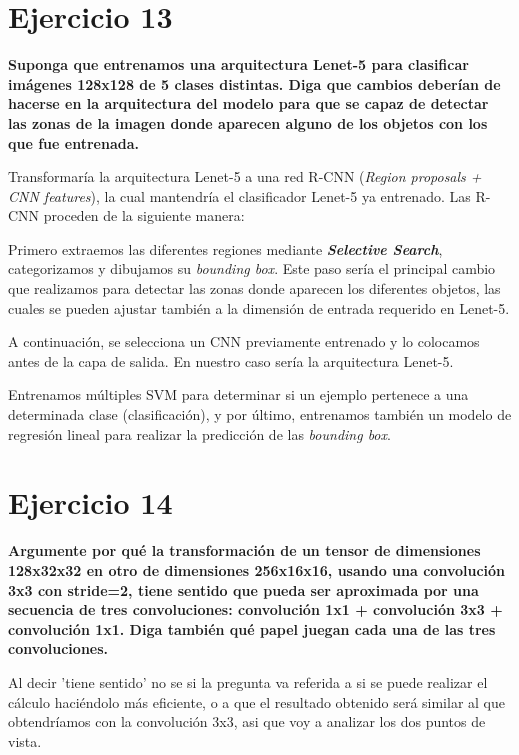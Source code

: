 \documentclass[11pt,a4paper]{article}
\begin{document}
\section*{Ejercicio 13}

\textbf{Suponga que entrenamos una arquitectura Lenet-5 para clasificar imágenes 128x128 de 5 clases distintas. Diga que cambios deberían de hacerse en la arquitectura
del modelo para que se capaz de detectar las zonas de la imagen donde aparecen alguno de los objetos con los que fue entrenada.}

Transformaría la arquitectura Lenet-5 a una red R-CNN (\textit{Region proposals + CNN features}), la cual mantendría el clasificador Lenet-5 ya entrenado. Las R-CNN 
proceden de la siguiente manera:

Primero extraemos las diferentes regiones mediante \textbf{\textit{Selective Search}}, categorizamos y dibujamos su \textit{bounding box}. Este paso sería el principal
cambio que realizamos para detectar las zonas donde aparecen los diferentes objetos, las cuales se pueden ajustar también a la dimensión de entrada requerido en Lenet-5.

A continuación, se selecciona un CNN previamente entrenado y lo colocamos antes de la capa de salida. En nuestro caso sería la arquitectura Lenet-5.

Entrenamos múltiples SVM para determinar si un ejemplo pertenece a una determinada clase (clasificación), y por último, entrenamos también un modelo de regresión lineal para
realizar la predicción de las \textit{bounding box}.


\section*{Ejercicio 14}

\textbf{Argumente por qué la transformación de un tensor de dimensiones 128x32x32 en otro de dimensiones 256x16x16, usando una convolución 3x3 con stride=2, tiene sentido
que pueda ser aproximada por una secuencia de tres convoluciones: convolución 1x1 + convolución 3x3 + convolución 1x1. Diga también qué papel juegan cada una de las tres
convoluciones.}

\newpage
Al decir 'tiene sentido' no se si la pregunta va referida a si se puede realizar el cálculo haciéndolo más eficiente, o a que el resultado obtenido será similar al que
obtendríamos con la convolución 3x3, asi que voy a analizar los dos puntos de vista.
\end{document}
